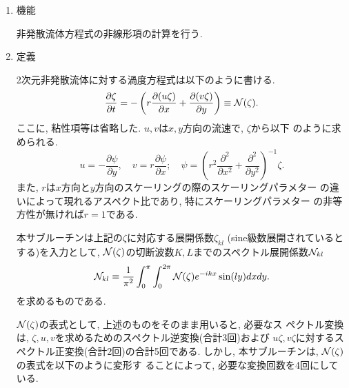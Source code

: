 \documentclass[a4j,fleqn]{jarticle}
\begin{document}
\begin{enumerate}

\item 機能 

非発散流体方程式の非線形項の計算を行う.

\item 定義

2次元非発散流体に対する渦度方程式は以下のように書ける.
\[
\frac{\partial\zeta}{\partial t}=
-\left(r\frac{\partial(u\zeta)}{\partial x}
       +\frac{\partial(v\zeta)}{\partial y}\right)
\equiv{\cal N}(\zeta).
\]
ここに, 粘性項等は省略した. $u,v$は$x,y$方向の流速で, $\zeta$から以下
のように求められる.
\[
u=-\frac{\partial\psi}{\partial y},\quad
v=r\frac{\partial\psi}{\partial x}; \quad
\psi=\left(r^2\frac{\partial^2}{\partial x^2}
           +\frac{\partial^2}{\partial y^2}\right)^{-1}\zeta.
\]
また, $r$は$x$方向と$y$方向のスケーリングの際のスケーリングパラメター
の違いによって現れるアスペクト比であり, 特にスケーリングパラメター
の非等方性が無ければ$r=1$である.

本サブルーチンは上記の$\zeta$に対応する展開係数$\zeta_{kl}$
(sine級数展開されているとする)を入力として,
${\cal N}(\zeta)$の切断波数$K,L$までのスペクトル展開係数${\cal N}_{kl}$
\begin{equation}
{\cal N}_{kl}\equiv\frac1{\pi^2}\int^{\pi}_0\int^{2\pi}_0
{\cal N}(\zeta)e^{-ikx}\sin(ly)dxdy.
\end{equation}
を求めるものである. 

${\cal N}(\zeta)$の表式として, 上述のものをそのまま用いると, 必要なス
ペクトル変換は,
$\zeta,u,v$を求めるためのスペクトル逆変換(合計3回)および
$u\zeta,v\zeta$に対するスペクトル正変換(合計2回)の合計5回である.
しかし, 本サブルーチンは, ${\cal N}(\zeta)$の表式を以下のように変形す
ることによって, 必要な変換回数を4回にしている.


\end{enumerate}
\end{document}
